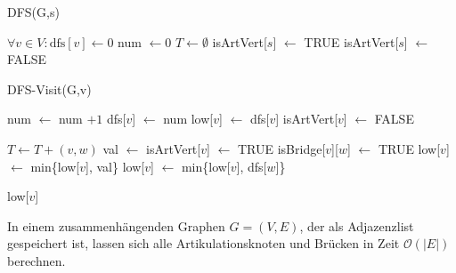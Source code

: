 \begin{algorithm}
    \caption{DFS(G,s)}
    \begin{algorithmic}[1]
        \State $\forall v \in V : \text{dfs}[v] \leftarrow 0$
        \State num $\leftarrow 0$ 
        \State $T \leftarrow \emptyset$ 
        \State {}
            \State isArtVert[$s$] $\leftarrow$ TRUE
        \Else
        \State isArtVert[$s$] $\leftarrow$ FALSE
        \EndIf
    \end{algorithmic}
\end{algorithm}
\pagebreak
\begin{algorithm}
    \caption{DFS-Visit(G,v)}
    \begin{algorithmic}[1]
        \State num $\leftarrow$ num $ + 1$
        \State dfs[$v$] $\leftarrow$ num
        \State low[$v$] $\leftarrow$ dfs[$v$]
        \State isArtVert[$v$] $\leftarrow$ FALSE

                \State $T \leftarrow T + (v,w)$
                \State val $\leftarrow$  
                \State isArtVert[$v$] $\leftarrow$ TRUE
                        \State isBridge[$v$][$w$] $\leftarrow$ TRUE
                    \EndIf
                \EndIf
                \State low[$v$] $\leftarrow$ min\{low[$v$], val\}
            \Else {}
                \State low[$v$] $\leftarrow$ min\{low[$v$], dfs[$w$]\}
            \EndIf
        \EndFor

        \State \Return low[$v$]
    \end{algorithmic}
\end{algorithm}


\begin{satz}[Satz]
    In einem zusammenhängenden Graphen $G = (V,E)$, der als Adjazenzlist gespeichert ist, lassen sich
    alle Artikulationsknoten und Brücken in Zeit $\mathcal{O}(|E|)$ berechnen.
\end{satz}
\bigskip